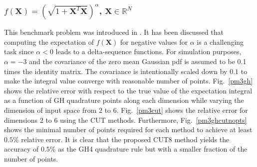 \documentclass[letterpaper, 10 pt, conference]{IEEEtran}  %
\begin{document}
   

\subsubsection{$f(\mathbf{X})=(\sqrt{1+\mathbf{X}^T\mathbf{X}})^{\alpha}$, $\mathbf{X}\in\mathbb{R}^N$ } This benchmark problem was introduced in \cite{Arackf}. It has been discussed that computing the expectation of $f(\mathbf{X})$ for negative values for  $\alpha$ is a challenging task since $\alpha<0$  leads to a delta-sequence functions. For simulation purposes, $\alpha=-3$ and the covariance of the zero mean Gaussian pdf is assumed to be 0.1 times the identity matrix.  The covariance is intentionally scaled down by $0.1$ to make the integral value converge with reasonable number of points. Fig.~\ref{pm3gh} shows the relative error with respect to the true value of the expectation integral as a function of GH quadrature points along each dimension while varying the dimension of input space from $2$ to $6$. Fig.~\ref{pm3cut} shows the relative error for dimensions $2$ to $6$ using the CUT methods. Furthermore, Fig.~\ref{pm3ghcutnopts} shows the minimal number of points required for each method to achieve at least $0.5\%$ relative error. It is clear that the proposed CUT8 method yields the accuracy of $0.5\%$ as the GH4 quadrature rule but with a smaller fraction of the number of points. 
\end{document}
